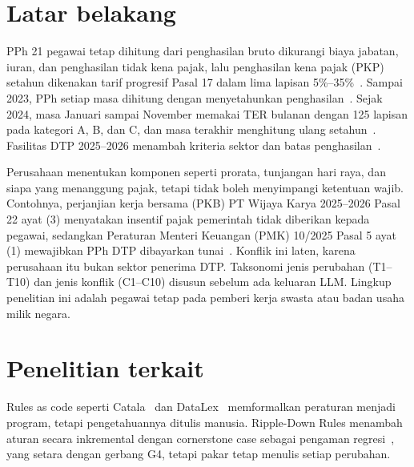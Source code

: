 \documentclass[conference]{IEEEtran}
\makeatletter
\DeclareRobustCommand{\en}[1]{{\usefont{\f@encoding}{\f@family}{\f@series}{it}#1\/}}
\makeatother
\begin{document}
\section{Latar belakang}
\label{sec:masalah}
PPh 21 pegawai tetap dihitung dari penghasilan bruto dikurangi biaya jabatan, iuran, dan penghasilan tidak kena pajak, lalu penghasilan kena pajak (PKP) setahun dikenakan tarif progresif Pasal 17 dalam lima lapisan 5\%--35\%~\cite{uu7_2021,pmk101_2016}. Sampai 2023, PPh setiap masa dihitung dengan menyetahunkan penghasilan~\cite{per16_2016}. Sejak 2024, masa Januari sampai November memakai TER bulanan dengan 125 lapisan pada kategori A, B, dan C, dan masa terakhir menghitung ulang setahun~\cite{pp58_2023,pmk168_2023}. Fasilitas DTP 2025--2026 menambah kriteria sektor dan batas penghasilan~\cite{pmk10_2025,pmk105_2025}.

Perusahaan menentukan komponen seperti prorata, tunjangan hari raya, dan siapa yang menanggung pajak, tetapi tidak boleh menyimpangi ketentuan wajib. Contohnya, perjanjian kerja bersama (PKB) PT Wijaya Karya 2025--2026 Pasal 22 ayat (3) menyatakan insentif pajak pemerintah tidak diberikan kepada pegawai, sedangkan Peraturan Menteri Keuangan (PMK) 10/2025 Pasal 5 ayat (1) mewajibkan PPh DTP dibayarkan tunai~\cite{pmk10_2025}. Konflik ini laten, karena perusahaan itu bukan sektor penerima DTP. Taksonomi jenis perubahan (T1--T10) dan jenis konflik (C1--C10) disusun sebelum ada keluaran LLM. Lingkup penelitian ini adalah pegawai tetap pada pemberi kerja swasta atau badan usaha milik negara.

\section{Penelitian terkait}
\label{sec:terkait}
\en{Rules as code} seperti Catala~\cite{merigoux2021catala} dan DataLex~\cite{mowbray2023scaling} memformalkan peraturan menjadi program, tetapi pengetahuannya ditulis manusia. \en{Ripple-Down Rules} menambah aturan secara inkremental dengan \en{cornerstone case} sebagai pengaman regresi~\cite{compton2021rdr}, yang setara dengan gerbang G4, tetapi pakar tetap menulis setiap perubahan.
\end{document}
